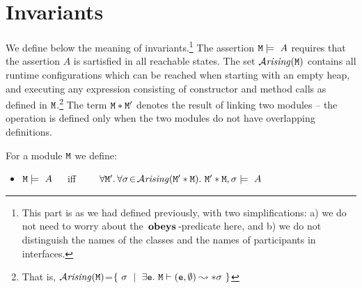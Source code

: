 \documentclass[preprint,10pt]{sigplanconf}
\begin{document}
  
\section{Invariants}

We define below the meaning of invariants.\footnote{This part is as we had defined previously, with two simplifications: a) we do not need to worry about the $\,\textbf{\textrm{obeys}}\,$-predicate here, and b) we do not distinguish the names of the classes and the names of participants in interfaces.}
The assertion ${\mbox{\tt{M}}}   \models\  A$ requires that  the assertion $A$ is sartisfied 
in all reachable states.
The   set  ${\mathcal{A}}\textrm{\textit{rising}}({\mbox{\tt{M}}})$ contains all runtime configurations which can be reached
when starting with an empty heap,  and executing any expression consisting of constructor  and method calls
as defined in ${\mbox{\tt{M}}}$.\footnote{That is,
${\mathcal{A}}\textrm{\textit{rising}}({\mbox{\tt{M}}})$=$\{ \ \sigma\ \mid\ \exists {\mbox{\tt{e}}}.\ {\mbox{\tt{M}}} \vdash ({\mbox{\tt{e}}},\emptyset) \leadsto* \sigma \ \}$}
The term 
${\mbox{\tt{M}}}*{\mbox{\tt{M}}}'$ denotes the result of linking two modules -- the operation is defined only when the
two modules do not have overlapping definitions.

 

\begin{definition}[Invariants]
\label{def:invariant}
\noindent
For a module ${\mbox{\tt{M}}}$  we define:\\

 \begin{itemize}
 \item
${\mbox{\tt{M}}}   \models\  A$\ \ \  iff\ \ \ \ 
$\forall {\mbox{\tt{M}}}'.\, \forall \sigma\!\in\!{\mathcal{A}}\textrm{\textit{rising}}({\mbox{\tt{M}}}'*{\mbox{\tt{M}}}).\ {\mbox{\tt{M}}}'*{\mbox{\tt{M}}},\sigma \models \  A$
 \end{itemize}
\end{definition}
\end{document}
